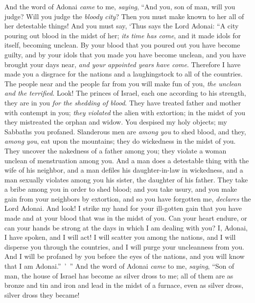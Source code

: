 \begin{biblechapter} %
 And the word of Adonai \textit{came} to me, \textit{saying},
\verse “And you, son of man, will you judge? Will you judge the \textit{bloody city}? Then you must make known to her all of her detestable things!
\verse And you must say, ‘Thus says the Lord Adonai: “A city pouring out blood in the midst of her; \textit{its time has come}, and it made idols for itself, becoming unclean.
\verse By your blood that you poured out you have become guilty, and by your idols that you made you have become unclean, and you have brought your days near, \textit{and your appointed years have come}. Therefore I have made you a disgrace for the nations and a laughingstock to all of the countries.
\verse The people near and the people far from you will make fun of you, \textit{the unclean and the terrified}.
\verse Look! The princes of Israel, each one according to his strength, they are in you \textit{for the shedding of blood}.
\verse They have treated father and mother with contempt in you; \textit{they violated} the alien with extortion; in the midst of you they mistreated the orphan and widow.
\verse You despised my holy objects; my Sabbaths you profaned.
\verse Slanderous men are \textit{among you} to shed blood, and they, \textit{among you}, eat upon the mountains; they do wickedness in the midst of you.
\verse They uncover the nakedness of a father among you; they violate a woman unclean of menstruation among you.
\verse And a man does a detestable thing with the wife of his neighbor, and a man defiles his daughter-in-law in wickedness, and a man sexually violates among you his sister, the daughter of his father.
\verse They take a bribe among you in order to shed blood; and you take usury, and you make gain from your neighbors by extortion, and so you have forgotten me, \textit{declares} the Lord Adonai.
\verse And look! I strike my hand for your ill-gotten gain that you have made and at your blood that was in the midst of you.
\verse Can your heart endure, or can your hands be strong at the days in which I am dealing with you? I, Adonai, I have spoken, and I will act!
\verse I will scatter you among the nations, and I will disperse you through the countries, and I will purge your uncleanness from you.
\verse And I will be profaned by you before the eyes of the nations, and you will know that I am Adonai.” ’ ”
\verse And the word of Adonai \textit{came} to me, \textit{saying},
\verse “Son of man, the house of Israel has become as silver dross to me; all of them are as bronze and tin and iron and lead in the midst of a furnace, even as silver dross, silver dross they became!

\end{biblechapter}
